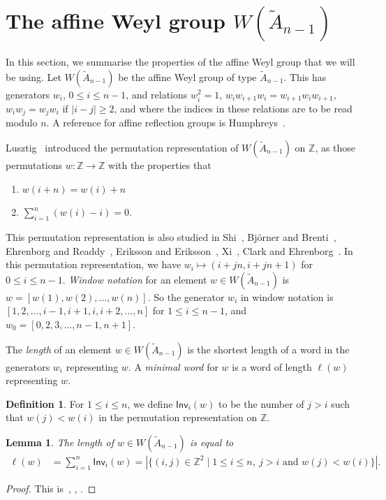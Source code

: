 \documentclass[12pt]{amsart}
\renewcommand{\ge}{\geqslant}
\renewcommand{\le}{\leqslant}
\newcommand{\Inv}{\mathsf{Inv}}
\newcommand{\bZ}{{\mathbb{Z}}}
\numberwithin{equation}{section}
\newtheorem{lemma}[equation]{Lemma}
\theoremstyle{definition}
\newtheorem{definition}[equation]{Definition}
\begin{document}
\section{\texorpdfstring{The affine Weyl group $W(\tilde A_{n-1})$}
{The affine Weyl group W(Ãₙ₋₁)}}\label{se:W}

In this section, we summarise the properties of the affine Weyl group
that we will be using.
Let $W(\tilde A_{n-1})$ be the affine Weyl group of type $\tilde
A_{n-1}$. 
This has generators
$w_i$, $0\le i\le n-1$, and relations $w_i^2=1$,
$w_iw_{i+1}w_i=w_{i+1}w_iw_{i+1}$, $w_iw_j=w_jw_i$ if $|i-j|\ge 2$,
and where the indices in these relations are to be read modulo
$n$. A reference for affine reflection groups is 
Humphreys~\cite{Humphreys:1990a}. 

Lusztig~\cite[\S3.6]{Lusztig:1983a} introduced the 
permutation representation of $W(\tilde A_{n-1})$ on $\bZ$, as
those permutations $w\colon\bZ\to\bZ$ with the properties that 
\begin{enumerate}
\item[(L.1)] $w(i+n)=w(i)+n$
\item[(L.2)] $\sum_{i=1}^{n}( w(i)-i)=0$.
\end{enumerate}
This permutation representation is also studied in
Shi~\cite[chapter~4]{Shi:1986a}, 
Bj\"orner and Brenti~\cite{Bjorner/Brenti:1996a}, 
Ehrenborg and Readdy~\cite[\S4]{Ehrenborg/Readdy:1996a}, 
Eriksson and Eriksson~\cite{Eriksson/Eriksson:1998a}, 
Xi~\cite[\S2.1]{Xi:2002a},
Clark and Ehrenborg~\cite{Clark/Ehrenborg:2011a}.
In this permutation representation, we have $w_i\mapsto (i+jn,i+jn+1)$ for  
$0\le i\le n-1$.  
\emph{Window notation} for an element $w\in W(\tilde A_{n-1})$ is
$w = [w(1),w(2),\dots,w(n)]$. So the generator
$w_i$ in window notation is $[1,2,\dots,i-1,i+1,i,i+2,\dots,n]$ for
$1\le i\le n-1$, and $w_0=[0,2,3,\dots,n-1,n+1]$.

The \emph{length} of an element $w\in W(\tilde A_{n-1})$ is the
shortest length of a word in the generators $w_i$ representing
$w$. 
A \emph{minimal word} for $w$ is a word of length $\ell(w)$
representing $w$.


\begin{definition}
For $1\le i\le n$, we define  $\Inv_i(w)$ to be the number of $j>i$ such  
that $w(j)<w(i)$ in the permutation representation on $\bZ$.  
\end{definition}

\begin{lemma}\label{le:ell1}
The length of $w\in W(\tilde A_{n-1})$ is equal to
\begin{align*} 
\ell(w)
&=\sum_{i=1}^n \Inv_i(w)
=|\{(i,j)\in\bZ^2\mid 1\le i\le  n,\ j>i\text{ and }
w(j)<w(i)\}|.
\end{align*}
\end{lemma}
\begin{proof}
This is~\cite[Theorem~15]{Eriksson/Eriksson:1998a}, 
\cite[Proposition~4.1\,(ii)]{Bjorner/Brenti:1996a},
\cite[\S2.1.3]{Xi:2002a}.
\end{proof}
\end{document}
